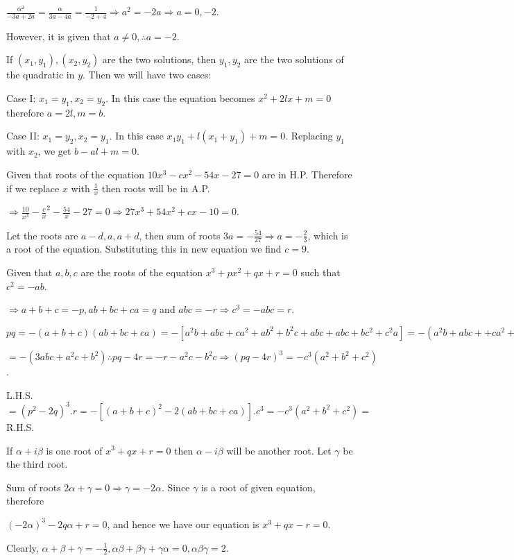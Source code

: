   $\frac{\alpha^2}{-3a + 2a} = \frac{\alpha}{3a - 4a} = \frac{1}{-2 + 4} \Rightarrow a^2 = -2a \Rightarrow a
  = 0, -2$.

  However, it is given that $a\neq 0, \therefore a = -2$.
\item If $(x_1, y_1), (x_2, y_2)$ are the two solutions, then $y_1, y_2$ are the two solutions of the
  quadratic in $y$. Then we will have two cases:

  Case I: $x_1 = y_1, x_2 = y_2$. In this case the equation becomes $x^2 + 2lx + m = 0$ therefore $a = 2l, m
  = b$.

  Case II: $x_1 = y_2, x_2 = y_1$. In this case $x_1y_1 + l(x_1 + y_1) + m = 0$. Replacing $y_1$ with $x_2$,
  we get $b - al + m = 0$.
\item Given that roots of the equation $10x^3 - cx^2 - 54x - 27 = 0$ are in H.P. Therefore if we replace $x$
  with $\frac{1}{x}$ then roots will be in A.P.

  $\Rightarrow \frac{10}{x^3} - \frac{c}{x}^2 - \frac{54}{x} - 27 = 0 \Rightarrow 27x^3 + 54x^2 + cx - 10 =
  0$.

  Let the roots are $a - d, a, a + d$, then sum of roots $3a = -\frac{54}{27}\Rightarrow a = -\frac{2}{3}$,
  which is a root of the equation. Substituting this in new equation we find $c = 9$.
\item Given that $a, b, c$ are the roots of the equation $x^3 + px^2 + qx + r = 0$ such that $c^2 = -ab$.

  $\Rightarrow a + b + c = -p, ab + bc + ca = q$ and $abc = -r \Rightarrow c^3 = -abc = r$.

  $pq = -(a + b + c)(ab + bc + ca) = -[a^2b + abc + ca^2 + ab^2 + b^2c + abc + abc + bc^2 + c^2a] = -(a^2b +
  abc + + ca^2 + ab^2 + b^2c + abc + abc - ab^2 -a^2b)$

  $= -(3abc + a^2c + b^2)\therefore pq - 4r = -r - a^2c - b^2c \Rightarrow (pq - 4r)^3 = -c^3(a^2 + b^2 +
  c^2)$.

  L.H.S. $= (p^2 - 2q)^3.r = -[(a + b + c)^2 - 2(ab + bc + ca)].c^3 = -c^3(a^2 + b^2 + c^2) =$ R.H.S.
\item If $\alpha + i\beta$ is one root of $x^3 + qx + r = 0$ then $\alpha - i\beta$ will be another
  root. Let $\gamma$ be the third root.

  Sum of roots $2\alpha + \gamma = 0 \Rightarrow \gamma = -2\alpha$. Since $\gamma$ is a root of given
  equation, therefore

  $(-2\alpha)^3 - 2q\alpha + r = 0$, and hence we have our equation is $x^3 + qx - r = 0$.
\item Clearly, $\alpha + \beta + \gamma = -\frac{1}{2}, \alpha\beta + \beta\gamma + \gamma\alpha = 0,
  \alpha\beta\gamma = 2$.

